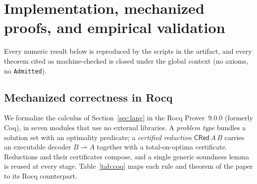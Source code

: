\documentclass[a4paper,fleqn]{cas-sc}
\begin{document}
\section{Implementation, mechanized proofs, and empirical validation}
\label{sec:eval}

Every numeric result below is reproduced by the scripts in the artifact, and every
theorem cited as machine-checked is closed under the global context (no axioms, no
\texttt{Admitted}).

\subsection{Mechanized correctness in Rocq}
\label{sec:coq}

We formalize the calculus of Section~\ref{sec:lang} in the Rocq Prover~9.0.0 (formerly
Coq), in seven modules that use no external libraries. A \emph{problem type} bundles a
solution set with an optimality predicate; a \emph{certified reduction}
$\mathsf{CRed}\,A\,B$ carries an executable decoder $B\rightharpoonup A$ together with
a total-on-optima certificate. Reductions and their certificates compose, and a
single generic soundness lemma is reused at every stage. Table~\ref{tab:coq} maps each rule
and theorem of the paper to its Rocq counterpart.
\end{document}
